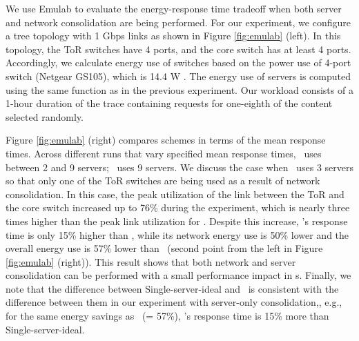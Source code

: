 We use Emulab to evaluate the energy-response time tradeoff when both server and network consolidation are being performed. For our experiment, we configure a tree topology with 1 Gbps links as shown in Figure \ref{fig:emulab} (left). 
In this topology, the ToR switches have 4 ports, and the core switch has at least 4 ports. Accordingly,  we calculate energy use of switches based on the power use of 4-port switch (Netgear GS105), which is 14.4 W \cite{netgearGS105}. The energy use of servers is computed using the same function as in the previous experiment. Our workload consists of a 1-hour duration of the trace containing requests for one-eighth of the content selected randomly.

Figure \ref{fig:emulab} (right) compares schemes in terms of the mean response times.  Across different runs that vary specified mean response times, \shrink\ uses between 2 and 9 servers; \peakS\ uses 9 servers.  We discuss the case when \shrink\ uses 3 servers so that only one of the ToR switches are being used as a result of network consolidation. In this case, the peak utilization of the link between the ToR and the core switch increased up to 76\% during the experiment, which is nearly three times higher than the peak link utilization for \peakS. Despite this increase, \shrink's response time is only 15\% higher than \peakS, while its network energy use is 50\% lower and the overall energy use is 57\% lower than \peakS\ (second point from the left in Figure \ref{fig:emulab} (right)). This result shows that both network and server consolidation can be performed with a small performance impact in \cdc s. Finally, we note that the difference between Single-server-ideal and \shrink\ is consistent with the difference between them in our experiment with server-only consolidation,, e.g., for the same energy savings as \shrink\ (= 57\%), \shrink's response time is 15\% more than Single-server-ideal.



